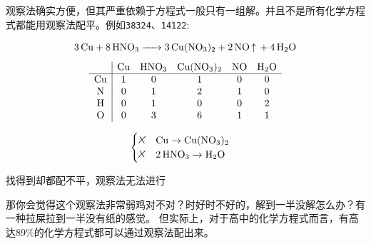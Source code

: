 \documentclass{chem-art}
\begin{document}
观察法确实方便，但其严重依赖于方程式一般只有一组解。并且不是所有化学方程式都能用观察法配平。例如\verb|38324|、\verb|14122|:
\begin{center}
    \noindent
    \begin{minipage}[c]{0.55\textwidth}
        \begin{equation}
            \ce{3Cu + 8HNO3 -> 3Cu(NO3)2 + 2NO ^ + 4H2O}
            \label{fig:failed-inspection}
        \end{equation}
        \[
            \begin{array}{c|ccccc}
                & \ce{Cu} & \ce{HNO3} & \ce{Cu(NO3)2} & \ce{NO} &
                \ce{H2O} \\
                \hline
                \ce{Cu} & 1 & 0 & 1 & 0 & 0\\
                \ce{N} & 0 & 1 & 2 & 1 & 0\\
                \ce{H} & 0 & 1 & 0 & 0 & 2\\
                \ce{O} & 0 & 3 & 6 & 1 & 1\\
            \end{array}
        \]
    \end{minipage}
    \hspace{0.01\textwidth}
    \begin{minipage}[c]{0.3\textwidth}
        \[
            \begin{cases}
                \xmark \quad \ce{Cu} \to \ce{Cu(NO3)2} \\
                \xmark \quad \ce{2HNO3} \to \ce{H2O} \\
            \end{cases}
        \]
    \end{minipage}
\end{center}

找得到却都配不平，观察法无法进行

那你会觉得这个观察法非常弱鸡对不对？时好时不好的，解到一半没解怎么办？有一种拉屎拉到一半没有纸的感觉。
但实际上，对于高中的化学方程式而言，有高达89\%的化学方程式都可以通过观察法配出来。
\end{document}
